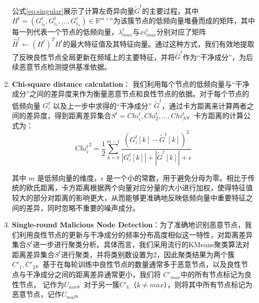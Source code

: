 \documentclass[lettersize,journal]{IEEEtran}
\begin{document}
\begin{enumerate}
公式\ref{eq:singular}展示了计算左奇异向量$\tilde{G}^t$的主要过程，其中\(H^t = ({G_{i_0}^t}, {G_{i_1}^t}, \ldots, {G_{i_n}^t}) \in \mathbb{R}^{m \times n}\)为该簇节点的低频向量堆叠而成的矩阵，其中每一列代表一个节点的低频向量，$\lambda_{max}^t$与$xi_{max}^t$分别对应了矩阵$\hat{H}^t \gets (H^t)^{T} H^t$的最大特征值及其特征向量。通过这种方式，我们有效地提取了反映良性节点全局更新在频域上的主要特征，并将$\tilde{G}^t$作为“干净成分”，为后续恶意节点检测提供基准依据。

\item \textbf{Chi-square distance calculation}：
我们利用每个节点的低频向量与“干净成分”之间的差异度来作为衡量恶意节点和良性节点的依据。对于每个节点的低频向量 \(G_i^t\) 以及上一步中求得的“干净成分” \(\tilde{G}^t\)，通过卡方距离来计算两者之间的差异度，得到距离差异集合$S^t = Chi^t_i, Chi^t_2, \ldots, Chi^t_N$。卡方距离的计算公式为：
\begin{equation}
{Chi^t_i}^2 = \frac{1}{2} \sum_{k=0}^{m-1}\frac{(G_i^t[k] - {\tilde G}^t[k])^2}{|G_i^t[k]|+|{\tilde G}^t[k]| + \epsilon}
\label{equation:KL}
\end{equation}

其中 \(m\) 是低频向量的维度，\(\epsilon\) 是一个小的常数，用于避免分母为零。相比于传统的欧氏距离，卡方距离根据两个向量对应分量的大小进行加权，使得特征值较大的部分对距离的影响更大，从而能够更准确地反映低频向量中重要特征之间的差异，同时忽略不重要的噪声成分。






\item \textbf{Single-round Malicious Node Detection}：为了准确地识别恶意节点，我们利用良性节点的更新与干净成分的频率分布高度相似这一特性，对距离差异集合$S^t$进一步进行聚类分析。具体而言，我们采用流行的KMeans聚类算法对距离差异集合$S^t$进行聚类，并将类别数设置为2，因此聚类结果为两个簇\(C'_1, C'_2\)。基于在每轮训练中良性节点的数量通常多于恶意节点，以及良性节点与干净成分之间的距离差异通常更小，我们将 \(C'_{max}\)中的所有节点标记为良性节点， 记作为\(U_{nor}\)。对于另一簇\(C'_k\)（\(k \neq {max}\)），则将其中所有节点标记为恶意节点，记作\(U_{mal}\)。  





\end{enumerate}
\end{document}
